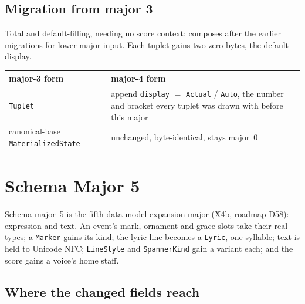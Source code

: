 \documentclass[11pt,letterpaper]{report}
\begin{document}
\subsection{Migration from major 3}
Total and default-filling, needing no score context; composes after the
earlier migrations for lower-major input. Each tuplet gains two zero bytes,
the default display.

\begin{center}
\begin{tabular}{p{1.9in} p{3.4in}}
  \toprule
  \textbf{major-3 form} & \textbf{major-4 form} \\
  \midrule
  \texttt{Tuplet} & append \texttt{display} $=$ \texttt{Actual} /
    \texttt{Auto}, the number and bracket every tuplet was drawn with before
    this major \\
  canonical-base \texttt{MaterializedState} & unchanged, byte-identical,
    stays major~0 \\
  \bottomrule
\end{tabular}
\end{center}

\section{Schema Major 5}
\label{sec:evolution:major5}

Schema major~5 is the fifth data-model expansion major (X4b, roadmap D58):
expression and text. An event's mark, ornament and grace slots take their
real types; a \texttt{Marker} gains its kind; the lyric line becomes a
\texttt{Lyric}, one syllable; text is held to Unicode NFC; \texttt{LineStyle}
and \texttt{SpannerKind} gain a variant each; and the score gains a voice's
home staff.

\subsection{Where the changed fields reach}
\end{document}
